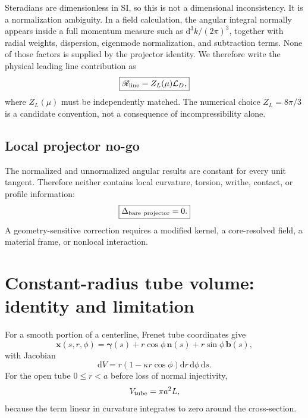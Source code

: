 \documentclass[aps,pre,preprint,notitlepage,nofootinbib,superscriptaddress]{revtex4-2}
\newcommand{\dd}{\mathrm d}
\newcommand{\calL}{\mathcal L}
\newcommand{\ZL}{Z_L}
\begin{document}
Steradians are dimensionless in SI, so this is not a dimensional inconsistency.  It is a normalization ambiguity.  In a field calculation, the angular integral normally appears inside a full momentum measure such as $\dd^3k/(2\pi)^3$, together with radial weights, dispersion, eigenmode normalization, and subtraction terms.  None of those factors is supplied by the projector identity.  We therefore write the physical leading line contribution as
\begin{equation}
  \boxed{\mathscr R_{\rm line}=\ZL(\mu)\calL_D,}
  \label{eq:open-line-coefficient}
\end{equation}
where $\ZL(\mu)$ must be independently matched.  The numerical choice $\ZL=8\pi/3$ is a candidate convention, not a consequence of incompressibility alone.

\subsection{Local projector no-go}

The normalized and unnormalized angular results are constant for every unit tangent.  Therefore neither contains local curvature, torsion, writhe, contact, or profile information:
\begin{equation}
  \boxed{\Delta_{\rm bare\ projector}=0.}
\end{equation}
A geometry-sensitive correction requires a modified kernel, a core-resolved field, a material frame, or nonlocal interaction.

\section{Constant-radius tube volume: identity and limitation}
\label{sec:tube-volume}

For a smooth portion of a centerline, Frenet tube coordinates give
\begin{equation}
  \bm x(s,r,\phi)=\bm\gamma(s)
  +r\cos\phi\,\bm n(s)+r\sin\phi\,\bm b(s),
\end{equation}
with Jacobian
\begin{equation}
  \dd V=r\left(1-\kappa r\cos\phi\right)
  \dd r\,\dd\phi\,\dd s.
\end{equation}
For the open tube $0\le r<a$ before loss of normal injectivity,
\begin{equation}
  V_{\rm tube}=\pi a^2L,
\end{equation}
because the term linear in curvature integrates to zero around the cross-section.
\end{document}
